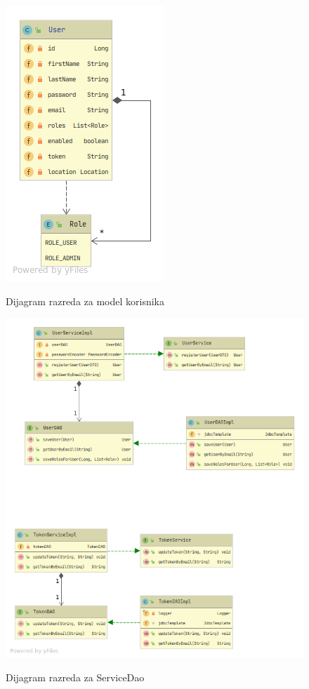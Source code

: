 			\begin{figure}[H]
				\includegraphics[scale=0.65]{slike/ModelUml.png} %
				\centering
				\caption \newline Dijagram razreda za model korisnika
				\label{fig:promjene}
			\end{figure}
			
			\begin{figure}[H]
				\includegraphics[scale=0.65]{slike/ServiceDaoUml.png} %
				\centering
				\caption \newline Dijagram razreda za ServiceDao
				\label{fig:promjene}
			\end{figure}
            
